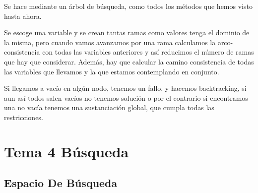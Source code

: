 \documentclass[12pt, twoside, openright]{report} %
\begin{document}
  Se hace mediante un árbol de búsqueda, como todos los métodos que
  hemos visto hasta ahora.


    Se escoge una variable y se crean tantas ramas como valores tenga el
    dominio de la misma, pero cuando vamos avanzamos por una rama
    calculamos la arco-consistencia con todas las variables anteriores y
    así reducimos el número de ramas que hay que considerar. Además, hay
    que calcular la camino consistencia de todas las variables que
    llevamos y la que estamos contemplando en conjunto.

    Si llegamos a vacío en algún nodo, tenemos un fallo, y hacemos
    backtracking, si aun así todos salen vacíos no tenemos solución o
    por el contrario si encontramos una no vacía tenemos una
    sustanciación global, que cumpla todas las restricciones.

	

\chapter{Tema 4 Búsqueda}

\section{Espacio De Búsqueda}
\end{document}
